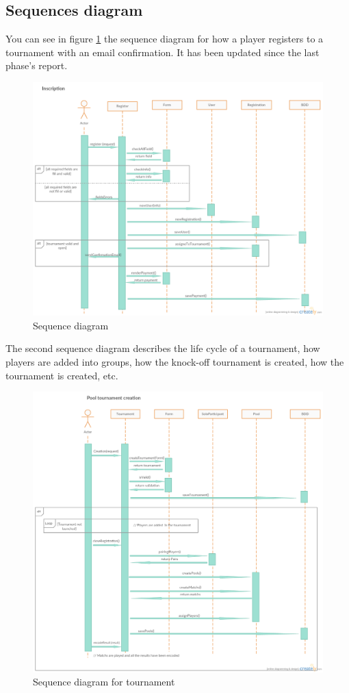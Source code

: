 \documentclass[a4paper, 12pt]{article}
\begin{document}
\subsection*{Sequences diagram}

You can see in figure \ref{playerseq} the sequence diagram for how a player registers to a tournament with an email confirmation. It has been updated since the last phase's report.

\begin{figure}[h]
   \caption{\label{playerseq} Sequence diagram}
  \includegraphics[scale=0.4]{Inscription.png}
\end{figure}

The second sequence diagram describes the life cycle of a tournament, how players are added into groups, how the knock-off tournament is created, how the tournament is created, etc. 

\begin{figure}[h]
   \caption{\label{tournseq} Sequence diagram for tournament}
  \includegraphics[scale=0.4]{Tournament.png}
\end{figure}
\end{document}
